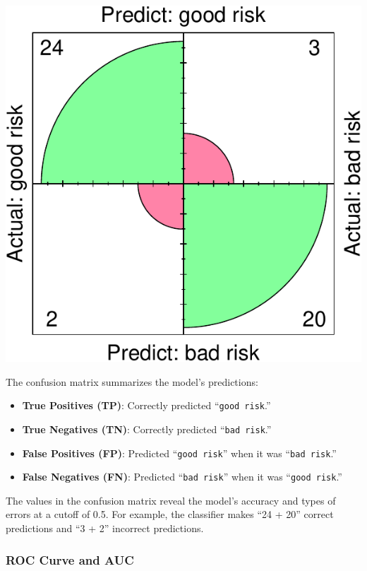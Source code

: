 \documentclass[
]{book}
\newcommand{\passthrough}[1]{#1}
\providecommand{\tightlist}{%
  \setlength{\itemsep}{0pt}\setlength{\parskip}{0pt}}
\theoremstyle{definition}
\theoremstyle{definition}
\theoremstyle{definition}
\theoremstyle{definition}
\theoremstyle{remark}
\begin{document}
\begin{center}\includegraphics[width=0.65\linewidth]{bayes_files/figure-latex/unnamed-chunk-16-1} \end{center}

The confusion matrix summarizes the model's predictions:

\begin{itemize}
\tightlist
\item
  \textbf{True Positives (TP)}: Correctly predicted ``\passthrough{\lstinline!good risk!}.''\\
\item
  \textbf{True Negatives (TN)}: Correctly predicted ``\passthrough{\lstinline!bad risk!}.''\\
\item
  \textbf{False Positives (FP)}: Predicted ``\passthrough{\lstinline!good risk!}'' when it was ``\passthrough{\lstinline!bad risk!}.''\\
\item
  \textbf{False Negatives (FN)}: Predicted ``\passthrough{\lstinline!bad risk!}'' when it was ``\passthrough{\lstinline!good risk!}.''
\end{itemize}

The values in the confusion matrix reveal the model's accuracy and types of errors at a cutoff of 0.5. For example, the classifier makes ``24 + 20'' correct predictions and ``3 + 2'' incorrect predictions.

\subsubsection*{ROC Curve and AUC}\label{roc-curve-and-auc-1}
\end{document}
